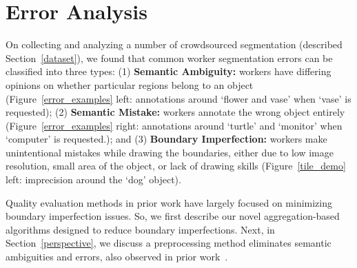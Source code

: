 \vspace{-7pt}
\section{Error Analysis\label{sec:error}}
\par On collecting and analyzing a number of crowdsourced segmentation (described Section~\ref{dataset}), we found that common worker segmentation errors can be classified into three types: (1) \textbf{Semantic Ambiguity:} workers have differing opinions on whether particular regions belong to an object (Figure~\ref{error_examples} left: annotations around `flower and vase' when `vase' is requested); (2) \textbf{Semantic Mistake:} workers annotate the wrong object entirely (Figure~\ref{error_examples} right: annotations around `turtle' and `monitor' when `computer' is requested.); and (3) \textbf{Boundary Imperfection:} workers make unintentional mistakes while drawing the boundaries, either due to low image resolution, small area of the object, or lack of drawing skills (Figure~\ref{tile_demo} left: imprecision around the `dog' object).
\par Quality evaluation methods in prior work have largely focused on minimizing boundary imperfection issues. So, we first describe our novel aggregation-based algorithms designed to reduce boundary imperfections. Next, in Section~\ref{perspective}, we discuss a preprocessing method eliminates semantic ambiguities and errors, also observed in prior work~\cite{Sorokin2008,Lin2014,Gurari2018}. %
